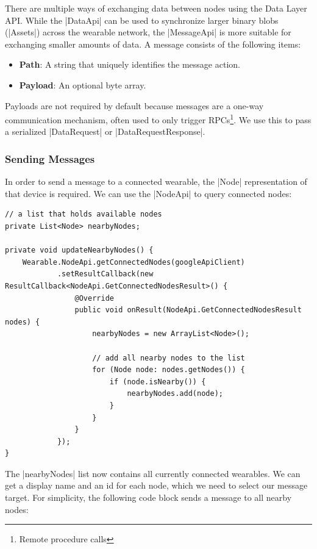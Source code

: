 There are multiple ways of exchanging data between nodes using the Data Layer API.
While the |DataApi|\cite{androiddocs:dataapi} can be used to synchronize larger binary blobs (|Assets|\cite{androiddocs:asset}) across the wearable network, the |MessageApi|\cite{androiddocs:messageapi} is more suitable for exchanging smaller amounts of data.
A message consists of the following items:
\begin{itemize}[noitemsep]
	\item \textbf{Path}:
	A string that uniquely identifies the message action. 
	\item \textbf{Payload}:
	An optional byte array.
\end{itemize}
Payloads are not required by default because messages are a one-way communication mechanism, often used to only trigger RPCs\footnote{Remote procedure calls}. We use this to pass a serialized |DataRequest|\cite{sensordatalogger:datarequest} or |DataRequestResponse|\cite{sensordatalogger:datarequestresponse}.

\clearpage

\subsubsection{Sending Messages}
\label{sec:implementation:transferringdata:send}

In order to send a message to a connected wearable, the |Node|\cite{androiddocs:node} representation of that device is required.
We can use the |NodeApi|\cite{androiddocs:nodeapi} to query connected nodes:

\begin{lstlisting}[label=nodes]
// a list that holds available nodes
private List<Node> nearbyNodes;

private void updateNearbyNodes() {
	Wearable.NodeApi.getConnectedNodes(googleApiClient)
			.setResultCallback(new ResultCallback<NodeApi.GetConnectedNodesResult>() {
				@Override
				public void onResult(NodeApi.GetConnectedNodesResult nodes) {
					nearbyNodes = new ArrayList<Node>();

					// add all nearby nodes to the list
					for (Node node: nodes.getNodes()) {
						if (node.isNearby()) {
							nearbyNodes.add(node);
						}
					}
				}
			});
}
\end{lstlisting}

\clearpage

The |nearbyNodes| list now contains all currently connected wearables.
We can get a display name and an id for each node, which we need to select our message target.
For simplicity, the following code block sends a message to all nearby nodes:

